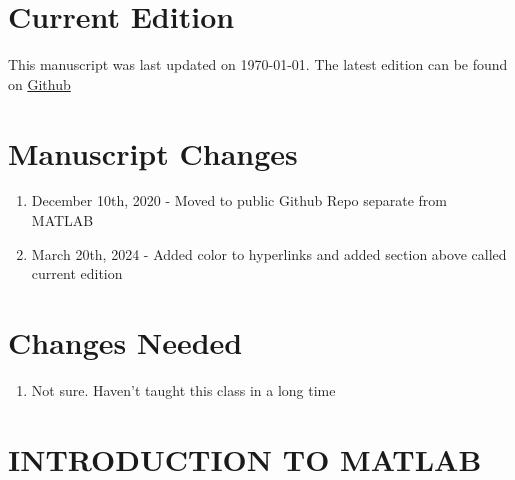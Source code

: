 \documentclass{book}
\begin{document}


\section*{Current Edition}

This manuscript was last updated on \today. 
The latest edition can be found on \href{https://github.com/cmontalvo251/LaTeX/blob/master/Numerical_Methods_Montalvo/Numerical_Methods.pdf}{Github}

\section*{Manuscript Changes}

\begin{enumerate}[itemsep=-5pt]
\item December 10th, 2020 - Moved to public Github Repo separate from MATLAB
\item March 20th, 2024 - Added color to hyperlinks and added section above called current edition
\end{enumerate}

\section*{Changes Needed}

\begin{enumerate}[itemsep=-5pt]
  \item Not sure. Haven't taught this class in a long time
\end{enumerate}

\newpage

\tableofcontents

%

%

%

%


\section{INTRODUCTION TO MATLAB}










\end{document}
